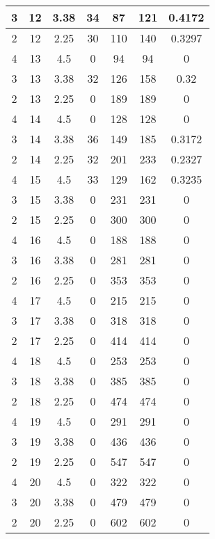 \documentclass[letterpaper, 12pt]{article}
\begin{document}
\begin{longtable}{|c|c|c|c|c|c|c|}
\hline
3 & 12 & 3.38 & 34 & 87 & 121 & 0.4172 \\
\hline
2 & 12 & 2.25 & 30 & 110 & 140 & 0.3297 \\
\hline
4 & 13 & 4.5 & 0 & 94 & 94 & 0 \\
\hline
3 & 13 & 3.38 & 32 & 126 & 158 & 0.32 \\
\hline
2 & 13 & 2.25 & 0 & 189 & 189 & 0 \\
\hline
4 & 14 & 4.5 & 0 & 128 & 128 & 0 \\
\hline
3 & 14 & 3.38 & 36 & 149 & 185 & 0.3172 \\
\hline
2 & 14 & 2.25 & 32 & 201 & 233 & 0.2327 \\
\hline
4 & 15 & 4.5 & 33 & 129 & 162 & 0.3235 \\
\hline
3 & 15 & 3.38 & 0 & 231 & 231 & 0 \\
\hline
2 & 15 & 2.25 & 0 & 300 & 300 & 0 \\
\hline
4 & 16 & 4.5 & 0 & 188 & 188 & 0 \\
\hline
3 & 16 & 3.38 & 0 & 281 & 281 & 0 \\
\hline
2 & 16 & 2.25 & 0 & 353 & 353 & 0 \\
\hline
4 & 17 & 4.5 & 0 & 215 & 215 & 0 \\
\hline
3 & 17 & 3.38 & 0 & 318 & 318 & 0 \\
\hline
2 & 17 & 2.25 & 0 & 414 & 414 & 0 \\
\hline
4 & 18 & 4.5 & 0 & 253 & 253 & 0 \\
\hline
3 & 18 & 3.38 & 0 & 385 & 385 & 0 \\
\hline
2 & 18 & 2.25 & 0 & 474 & 474 & 0 \\
\hline
4 & 19 & 4.5 & 0 & 291 & 291 & 0 \\
\hline
3 & 19 & 3.38 & 0 & 436 & 436 & 0 \\
\hline
2 & 19 & 2.25 & 0 & 547 & 547 & 0 \\
\hline
4 & 20 & 4.5 & 0 & 322 & 322 & 0 \\
\hline
3 & 20 & 3.38 & 0 & 479 & 479 & 0 \\
\hline
2 & 20 & 2.25 & 0 & 602 & 602 & 0 \\
\hline
\end{longtable}
\end{document}
